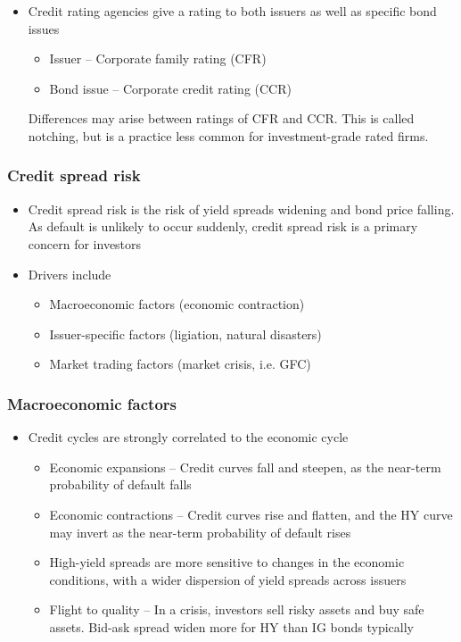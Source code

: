 \documentclass[../notes_compiled.tex]{subfiles}
\begin{document}
\begin{itemize}
\item Credit rating agencies give a rating to both issuers as well as specific bond issues
\begin{itemize}
\item Issuer -- Corporate family rating (CFR)
\item Bond issue -- Corporate credit rating (CCR)
\end{itemize}
Differences may arise between ratings of CFR and CCR. This is called notching, but is a practice less common for investment-grade rated firms.
\end{itemize}


\subsubsection{Credit spread risk}
\begin{itemize}
\item Credit spread risk is the risk of yield spreads widening and bond price falling. As default is unlikely to occur suddenly, credit spread risk is a primary concern for investors
\item Drivers include
\begin{itemize}
\item Macroeconomic factors (economic contraction)
\item Issuer-specific factors (ligiation, natural disasters)
\item Market trading factors (market crisis, i.e. GFC)
\end{itemize}
\end{itemize}

\subsubsection*{Macroeconomic factors}
\begin{itemize}
\item Credit cycles are strongly correlated to the economic cycle
\begin{itemize}
\item Economic expansions -- Credit curves fall and steepen, as the near-term probability of default falls
\item Economic contractions -- Credit curves rise and flatten, and the HY curve may invert as the near-term probability of default rises
\item High-yield spreads are more sensitive to changes in the economic conditions, with a wider dispersion of yield spreads across issuers
\item Flight to quality -- In a crisis, investors sell risky assets and buy safe assets. Bid-ask spread widen more for HY than IG bonds typically
\end{itemize}
\end{itemize}
\end{document}
